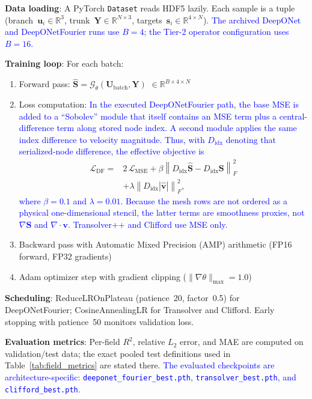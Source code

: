 \documentclass[journal]{IEEEtran}
\newcommand{\added}[1]{\textcolor{blue}{#1}}
\begin{document}
\textbf{Data loading}: A PyTorch \texttt{Dataset} reads HDF5 lazily. Each sample is a tuple (branch~$\bm{u}_i \in \mathbb{R}^3$, trunk~$\bm{Y} \in \mathbb{R}^{N \times 3}$, targets~$\bm{s}_i \in \mathbb{R}^{4 \times N}$).  \added{The archived DeepONet and DeepONetFourier runs use $B=4$; the Tier-2 operator configuration uses $B=16$.}

\textbf{Training loop}: For each batch:
\begin{enumerate}
    \item Forward pass: $\hat{\bm{S}} = \mathcal{G}_\theta(\bm{U}_\text{batch}, \bm{Y})$ $\in \mathbb{R}^{B \times 4 \times N}$
    \item Loss computation:  \added{In the executed DeepONetFourier path, the base MSE is added to a ``Sobolev'' module that itself contains an MSE term plus a central-difference term along stored node index. A second module applies the same index difference to velocity magnitude. Thus, with $D_{\mathrm{idx}}$ denoting that serialized-node difference, the effective objective is}
    {\color{blue}
    \begin{equation}
    \begin{aligned}
    \mathcal{L}_{\mathrm{DF}} ={}& 2\,\mathcal{L}_{\mathrm{MSE}}
      + \beta \left\|D_{\mathrm{idx}}\hat{\bm S}-D_{\mathrm{idx}}\bm S\right\|_F^2 \\
      &+ \lambda \left\|D_{\mathrm{idx}}|\hat{\bm v}|\right\|_F^2,
    \end{aligned}
    \label{eq:total_loss}
    \end{equation}}
    \added{where $\beta=0.1$ and $\lambda=0.01$. Because the mesh rows are not ordered as a physical one-dimensional stencil, the latter terms are smoothness proxies, not $\nabla\bm S$ and $\nabla\!\cdot\!\bm v$. Transolver++ and Clifford use MSE only.}
    \item Backward pass with Automatic Mixed Precision (AMP) arithmetic (FP16 forward, FP32 gradients)
    \item Adam optimizer step with gradient clipping ($\|\nabla\theta\|_\text{max} = 1.0$)
\end{enumerate}

\textbf{Scheduling}: ReduceLROnPlateau (patience~20, factor~0.5) for DeepONetFourier; CosineAnnealingLR for Transolver and Clifford. Early stopping with patience~50 monitors validation loss.

\textbf{Evaluation metrics}: Per-field $R^2$, relative $L_2$ error, and MAE are computed on validation/test data; the exact pooled test definitions used in Table~\ref{tab:field_metrics} are stated there.  \added{The evaluated checkpoints are architecture-specific: \texttt{deeponet\_fourier\_best.pth}, \texttt{transolver\_best.pth}, and \texttt{clifford\_best.pth}.}
\end{document}
